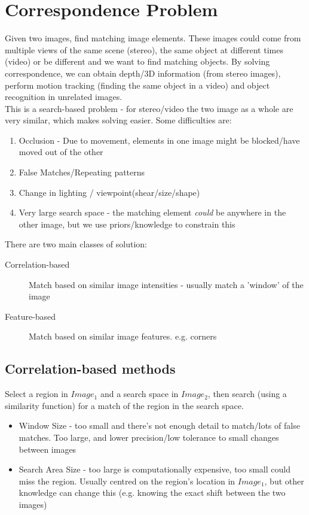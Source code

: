 \section{Correspondence Problem}
Given two images, find matching image elements. These images could come from multiple views of the same scene (stereo), the same object at different times (video) or be different and we want to find matching objects. By solving correspondence, we can obtain depth/3D information (from stereo images), perform motion tracking (finding the same object in a video) and object recognition in unrelated images. \\

This is a search-based problem - for stereo/video the two image as a whole are very similar, which makes solving easier. Some difficulties are:
\begin{enumerate}
    \item Occlusion - Due to movement, elements in one image might be blocked/have moved out of the other
    \item False Matches/Repeating patterns 
    \item Change in lighting / viewpoint(shear/size/shape)
    \item Very large search space - the matching element \emph{could} be anywhere in the other image, but we use priors/knowledge to constrain this
\end{enumerate}

There are two main classes of solution:
\begin{description}
    \item [Correlation-based] Match based on similar image intensities - usually match a 'window' of the image
    \item [Feature-based] Match based on similar image features. e.g. corners
\end{description}

\subsection{Correlation-based methods}
Select a region in $Image_1$ and a search space in $Image_2$, then search (using a similarity function) for a match of the region in the search space. 
\begin{itemize}
    \item Window Size - too small and there's not enough detail to match/lots of false matches. Too large, and lower precision/low tolerance to small changes between images
    \item Search Area Size - too large is computationally expensive, too small could miss the region. Usually centred on the region's location in $Image_1$, but other knowledge can change this (e.g. knowing the exact shift between the two images)
\end{itemize}


